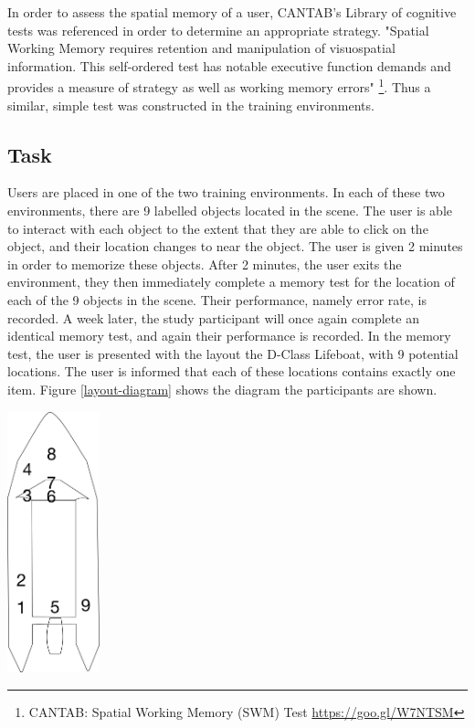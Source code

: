 \documentclass[ %
                    author={Elis Jones},
                supervisor={Dr. Kirsten Cater},
                    degree={BSc},
                     title={The Effect of Presentation Medium on Spatial Cognition},
                  subtitle={in the Virtual Environment},
                      year={2018} ]{dissertation}
\begin{document}
In order to assess the spatial memory of a user, CANTAB's Library of cognitive tests was referenced in order to determine an appropriate strategy. "Spatial Working Memory requires retention and manipulation of visuospatial information. This self-ordered test has notable executive function demands and provides a measure of strategy as well as working memory errors" \footnote{ CANTAB: Spatial Working Memory (SWM) Test \url{https://goo.gl/W7NTSM}}. Thus a similar, simple test was constructed in the training environments. 

\subsection{Task}
Users are placed in one of the two training environments. In each of these two environments, there are 9 labelled objects located in the scene. The user is able to interact with each object to the extent that they are able to click on the object, and their location changes to near the object. The user is given 2 minutes in order to memorize these objects. After 2 minutes, the user exits the environment, they then immediately complete a memory test for the location of each of the 9 objects in the scene. Their performance, namely error rate, is recorded. A week later, the study participant will once again complete an identical memory test, and again their performance is recorded. In the memory test, the user is presented with the layout the D-Class Lifeboat, with 9 potential locations. The user is informed that each of these locations contains exactly one item. Figure \ref{layout-diagram} shows the diagram the participants are shown. 

\begin{minipage}{\textwidth}
\hfill \break
\centering
\includegraphics[width=0.2\textwidth]{images/ilb_simple}
\label{layout-diagram}
\hfill \break
\end{minipage}
\newpage
\end{document}
